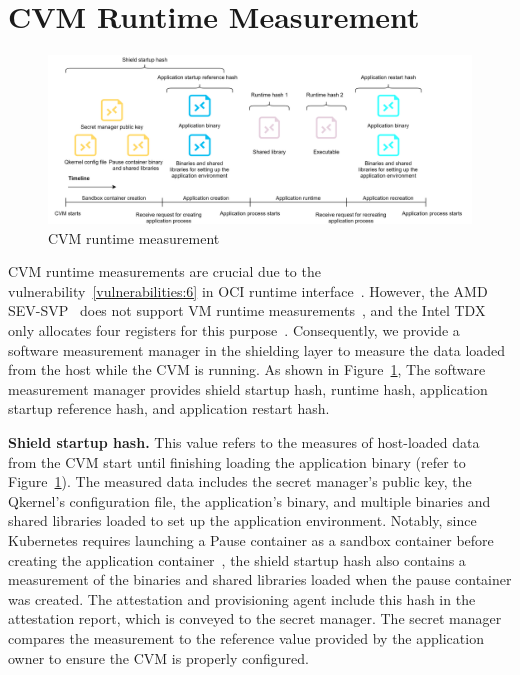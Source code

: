 \section{\acrshort{CVM} Runtime Measurement}
\label{sec:Enclave_Runtime_Measurement}
\begin{figure}[!htb]
    \centering
    \includegraphics[width=1\textwidth]{images/soft_ware_manager_meausrment.png}
    \caption[\acrshort{CVM} runtime measurement]{\acrshort{CVM} runtime measurement}
    \label{fig:soft_ware_manager_meausrment}
\end{figure}
\acrshort{CVM} runtime measurements are crucial due to the vulnerability~\ref{vulnerabilities:6} in  OCI runtime interface~\cite*{oci-runtime-spec}. However, the AMD SEV-SVP~\cite*{SEV_SNP_white_book} does not support VM runtime measurements~\cite*{snp_firmware}, and the Intel TDX only allocates four registers for this purpose~\cite*{Intel_tdx_whitepaper}. Consequently, we provide a software measurement 
manager in the shielding layer to measure the data loaded from the host while the \acrshort{CVM} is running. As shown in Figure~\ref{fig:soft_ware_manager_meausrment}, The software measurement manager provides shield startup hash, runtime hash, application startup reference hash, and application restart hash.

\textbf{Shield startup hash.} This value refers to the measures of host-loaded data from the \acrshort{CVM} start until finishing loading the application binary (refer to Figure~\ref{fig:soft_ware_manager_meausrment}). The measured data includes the secret manager's public key, the Qkernel's configuration file, the application's binary, and multiple binaries and 
shared libraries loaded to set up the application environment. Notably, since Kubernetes requires launching a Pause container as a sandbox container before creating the application container~\cite*{cri_plugin_arch}, the shield startup hash also contains a measurement of the binaries and shared libraries loaded when the pause container was created. The attestation 
and provisioning agent include this hash in the attestation report, which is conveyed to the secret manager. The secret manager compares the measurement to the reference value provided by the application owner to ensure the \acrshort{CVM} is properly configured.



